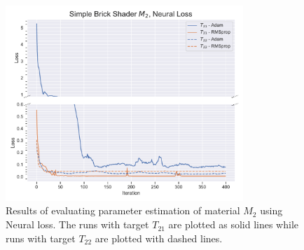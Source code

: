 \begin{figure}
    \centering
    \includegraphics[width=0.8\textwidth]{img/evaluation/M2/SBS_Neural.pdf}
    \caption{Results of evaluating parameter estimation of material $M_2$ using Neural loss. The runs with target $T_{21}$ are plotted as solid lines while runs with target $T_{22}$ are plotted with dashed lines.}
    \label{fig:M2NeuralData}
\end{figure}

